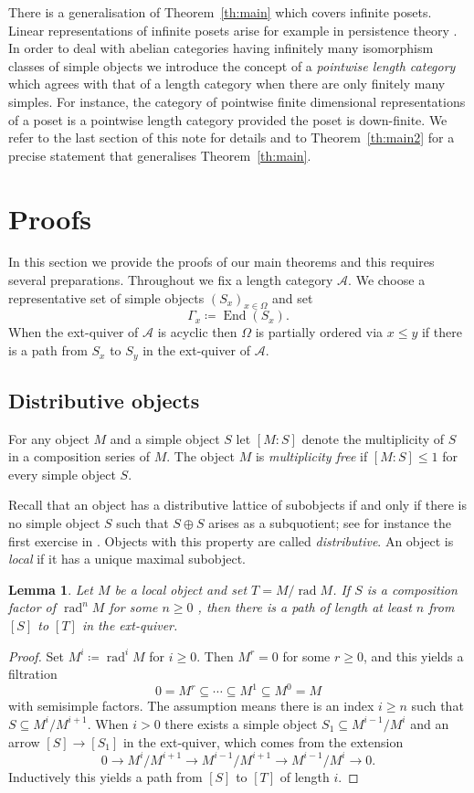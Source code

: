 \documentclass[a4paper]{amsart}
\theoremstyle{plain}
\newtheorem{lem}[thm]{Lemma}
\theoremstyle{definition}
\theoremstyle{remark}
\numberwithin{equation}{section}
\newcommand{\End}{\operatorname{End}}
\newcommand{\rad}{\operatorname{rad}}
\newcommand{\lto}{\longrightarrow}
\def\A{\mathcal A}
\def\Ga{\Gamma}
\begin{document}
There is a generalisation of Theorem~\ref{th:main} which covers
infinite posets. Linear representations of infinite posets arise for
example in persistence theory \cite{Ou2015}. In order to deal with
abelian categories having infinitely many isomorphism classes of
simple objects we introduce the concept of a \emph{pointwise length
  category} which agrees with that of a length category when there are
only finitely many simples. For instance, the category of pointwise
finite dimensional representations of a poset is a pointwise length
category provided the poset is down-finite. We refer to the last
section of this note for details and to Theorem~\ref{th:main2}
for a precise statement that generalises Theorem~\ref{th:main}.

\section{Proofs}

In this section we provide the proofs of our main theorems and this
requires several preparations. Throughout we fix a length category
$\A$. We choose a representative set of simple objects
$(S_x)_{x\in \Omega}$ and set
\[\Ga_x\coloneqq \End(S_x).\]
When the ext-quiver of $\A$ is acyclic then $\Omega$ is partially
ordered via $x\le y$ if there is a path from $S_x$ to $S_y$ in the
ext-quiver of $\A$.


\subsection*{Distributive objects}

For any object $M$ and a simple object
$S$ let $[M:S]$ denote the multiplicity of $S$ in a composition series
of $M$. The object $M$ is \emph{multiplicity free} if  $[M:S]\le 1$
for every simple object $S$.

Recall that an object has a distributive lattice of subobjects if and
only if there is no simple object $S$ such that $S\oplus S$ arises as
a subquotient; see for instance the first exercise in
\cite{Be1991}. Objects with this property are called
\emph{distributive}. An object is \emph{local} if it has a unique
maximal subobject.

\begin{lem}\label{le:cycle}
  Let $M$ be a local object and set $T=M/\rad M$. If $S$ is a
  composition factor of $\rad ^n M$ for some $n\ge 0$ , then there is
  a path of length at least $n$ from $[S]$ to $[T]$ in the ext-quiver.
\end{lem}
\begin{proof}
  Set $M^i\coloneqq \rad^i M$ for $i\ge 0$. Then $M^r=0$ for some $r\ge 0$,
  and this yields a filtration
  \[0=M^r\subseteq\cdots \subseteq M^1 \subseteq M^0 =M\] with
  semisimple factors.  The assumption means there is an index $i\ge n$ such that
  $S\subseteq M^{i}/M^{i+1}$. When $i> 0$ 
  there exists a simple object
  $S_1\subseteq M^{i-1}/M^{i}$ and an arrow $[S]\to [S_1]$ in the ext-quiver,
  which comes from the extension
  \[0\lto M^{i}/M^{i+1}\lto M^{i-1}/M^{i+1}\lto M^{i-1}/M^{i}\lto 0.\]
  Inductively this yields a path from $[S]$ to $[T]$ of length $i$.
\end{proof}
\end{document}
